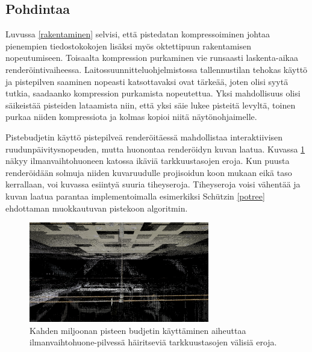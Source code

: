 \subsection{Pohdintaa}

Luvussa \ref{rakentaminen} selvisi, että pistedatan kompressoiminen johtaa pienempien tiedostokokojen lisäksi myös oktettipuun rakentamisen nopeutumiseen. Toisaalta kompression purkaminen vie runsaasti laskenta-aikaa renderöintivaiheessa. Laitossuunnitteluohjelmistossa tallennustilan tehokas käyttö ja pistepilven saaminen nopeasti katsottavaksi ovat tärkeää, joten olisi syytä tutkia, saadaanko kompression purkamista nopeutettua. Yksi mahdollisuus olisi säikeistää pisteiden lataamista niin, että yksi säie lukee pisteitä levyltä, toinen purkaa niiden kompressiota ja kolmas kopioi niitä näytönohjaimelle.

Pistebudjetin käyttö pistepilveä renderöitäessä mahdollistaa interaktiivisen ruudunpäivitysnopeuden, mutta huonontaa renderöidyn kuvan laatua. Kuvassa \ref{lod_border} näkyy ilmanvaihtohuoneen katossa ikäviä tarkkuustasojen eroja. Kun puusta renderöidään solmuja niiden kuvaruudulle projisoidun koon mukaan eikä taso kerrallaan, voi kuvassa esiintyä suuria tiheyseroja. Tiheyseroja voisi vähentää ja kuvan laatua parantaa implementoimalla esimerkiksi Schützin \ref{potree} ehdottaman muokkautuvan pistekoon algoritmin. 

\begin{figure}[h]
    \centering
    \includegraphics[width=0.7\textwidth]{tuloksia/ilmastointi_2M/ilmastointihuone_vesijohto_overviewbuf.png}
    \caption{Kahden miljoonan pisteen budjetin käyttäminen aiheuttaa ilmanvaihtohuone-pilvessä häiritseviä tarkkuustasojen välisiä eroja.}
    \label{lod_border}
\end{figure}


